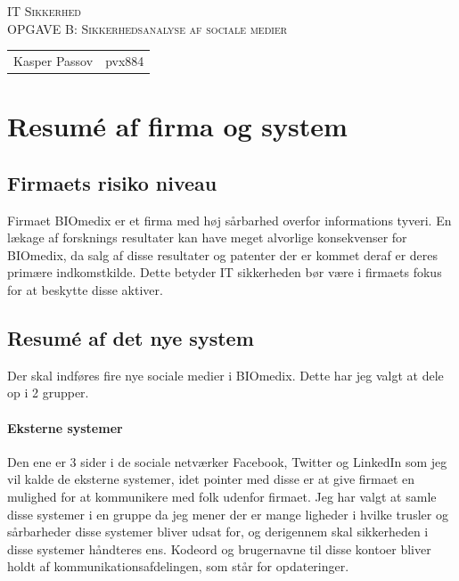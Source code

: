 \documentclass{article}
\begin{document}
\begin{titlepage}
\begin{center}
\textsc{\Large IT Sikkerhed}\\[0.5cm]
\textsc{OPGAVE B: Sikkerhedsanalyse af sociale medier}\\[0.5cm]
\vspace{2 cm}
\begin{tabular}{ll}
Kasper Passov & pvx884\\
\end{tabular}
\end{center}
\vspace{5 cm}
\newpage
\tableofcontents
\end{titlepage}

\section{Resumé af firma og system}
\subsection{Firmaets risiko niveau}
Firmaet BIOmedix er et firma med høj sårbarhed overfor informations tyveri. En lækage af forsknings resultater kan have meget alvorlige konsekvenser for BIOmedix, da salg af disse resultater og patenter der er kommet deraf er deres primære indkomstkilde. Dette betyder IT sikkerheden bør være i firmaets fokus for at beskytte disse aktiver. 

\subsection{Resumé af det nye system}
Der skal indføres fire nye sociale medier i BIOmedix. Dette har jeg valgt at dele op i 2 grupper. 

\paragraph{Eksterne systemer}
Den ene er 3 sider i de sociale netværker Facebook, Twitter og LinkedIn som jeg vil kalde de eksterne systemer, idet pointer med disse er at give firmaet en mulighed for at kommunikere med folk udenfor firmaet. Jeg har valgt at samle disse systemer i en gruppe da jeg mener der er mange ligheder i hvilke trusler og sårbarheder disse systemer bliver udsat for, og derigennem skal sikkerheden i disse systemer håndteres ens. Kodeord og brugernavne til disse kontoer bliver holdt af kommunikationsafdelingen, som står for opdateringer.
\end{document}
